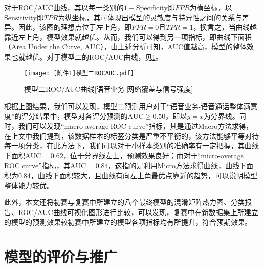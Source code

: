 \documentclass{MathorCupmodeling}
\begin{document}
\begin{itemize}
		对于ROC/AUC曲线，其以每一类别的$1-\mathrm{Specificity}$即$FPR$为横坐标，以$\mathrm{Sensitivity}$即$TPR$为纵坐标，其可体现出模型的灵敏度与特异性之间的关系与差异。因此，该图的理想点位于左上角，即$FPR=0$且$TPR=1$，换言之，当曲线越靠近左上角，模型效果就越优。从而，我们可以得到另一项指标，即曲线下面积（Area Under the Curve, AUC），由上述分析可知，AUC值越高，模型的整体效果也就越优。对于模型二的ROC/AUC曲线，见\textcolor{blue}{\cref{fig:SecondModelROCAUC}}。
		\begin{figure}[H]
			\centerline{\texttt{[image: [附件1]模型二ROCAUC.pdf]}}
			\caption{模型二ROC/AUC曲线[语音业务-网络覆盖与信号强度]}\label{fig:SecondModelROCAUC}
		\end{figure}
		根据上图结果，我们可以发现，模型二预测用户对于“语音业务-语音通话整体满意度”的评分结果中，模型对各评分预测的$\mathrm{AUC}\geqslant0.50$，即以$y=x$为分界线。同时，我们可以发现“macro-average ROC curve”指标，其是通过Macro方法求得，在上文中我们提到，该数据样本的标签分类是严重不平衡的，该方法能够平等对待每一项分类，在此方法下，我们可以对于小样本类别的准确率有一定把握，其曲线下面积$\mathrm{AUC}=0.62$，位于分界线左上，预测效果良好；而对于“micro-average ROC curve”指标，其$\mathrm{AUC}=0.84$，这指的是利用Micro方法求得曲线，曲线下面积为0.84，曲线下面积较大，且曲线有向左上角最优点靠近的趋势，可以说明模型整体能力较优。
	\end{itemize}
	
	此外，本文还将初赛与复赛中所建立的八个最终模型的混淆矩阵热力图、分类报告、ROC/AUC曲线可视化图形进行比较，可以发现，复赛中在新数据集上所建立的模型的预测效果较初赛中所建立的模型各项指标均有所提升，符合预期效果。
	\section{模型的评价与推广}
\end{document}
